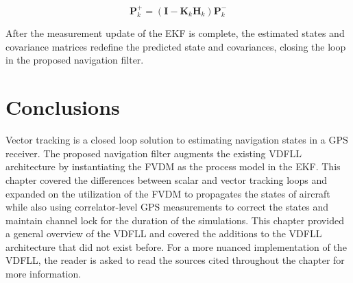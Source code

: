 \begin{equation}\label{eq:pplus}
    \mathbf{P}^+_k = \left(\mathbf{I} - \mathbf{K}_k\mathbf{H}_k\right)\mathbf{P}^-_k
\end{equation}

After the measurement update of the EKF is complete, the estimated states and covariance matrices redefine the predicted state and covariances, closing the loop in the proposed navigation filter.

\section{\textbf{Conclusions}}
Vector tracking is a closed loop solution to estimating navigation states in a GPS receiver. The proposed navigation filter augments the existing VDFLL architecture by instantiating the FVDM as the process model in the EKF\@. This chapter covered the differences between scalar and vector tracking loops and expanded on the utilization of the FVDM to propagates the states of aircraft while also using correlator-level GPS measurements to correct the states and maintain channel lock for the duration of the simulations. This chapter provided a general overview of the VDFLL and covered the additions to the VDFLL architecture that did not exist before. For a more nuanced implementation of the VDFLL, the reader is asked to read the sources cited throughout the chapter for more information.